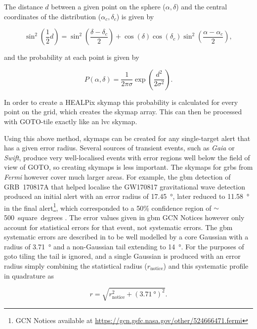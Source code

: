 \begin{colsection}
\begin{colsection}
The distance $d$ between a given point on the sphere ($\alpha, \delta$) and the central coordinates of the distribution ($\alpha_c, \delta_c$) is given by

\begin{equation}
    \sin^2 \left ( \frac{1}{2} d \right )
    = \sin^2 \left ( \frac{\delta-\delta_c}{2} \right)
      + \cos (\delta) \cos (\delta_c) \sin^2 \left ( \frac{\alpha-\alpha_c}{2} \right),
    \label{eq:gaussian_distance}
\end{equation}

and the probability at each point is given by

\begin{equation}
    P(\alpha, \delta) = \frac{1}{2\pi\sigma} \exp \left ( \frac{d^2}{2\sigma^2} \right ).
    \label{eq:gaussian_prob}
\end{equation}

In order to create a HEALPix skymap this probability is calculated for every point on the grid, which creates the skymap array. This can then be processed with GOTO-tile exactly like an \gls{lvc} skymap.

Using this above method, skymaps can be created for any single-target alert that has a given error radius. Several sources of transient events, such as \textit{Gaia} or \textit{Swift}, produce very well-localised events with error regions well below the field of view of GOTO, so creating skymaps is less important. The skymaps for \glspl{grb} from \textit{Fermi} however cover much larger areas. For example, the \gls{gbm} detection of GRB~170817A that helped localise the GW170817 gravitational wave detection produced an initial alert with an error radius of \SI{17.45}{\degree}, later reduced to \SI{11.58}{\degree} in the final alert\footnote{GCN Notices available at \url{https://gcn.gsfc.nasa.gov/other/524666471.fermi}}, which corresponded to a 50\% confidence region of $\sim$500~square~degrees \citep{GW170817_Fermi}. The error values given in \gls{gbm} GCN Notices however only account for statistical errors for that event, not systematic errors. The \gls{gbm} systematic errors are described in \citet{Fermi_localisation} to be well modelled by a core Gaussian with a radius of \SI{3.71}{\degree} and a non-Gaussian tail extending to \SI{14}{\degree}. For the purposes of \gls{goto} tiling the tail is ignored, and a single Gaussian is produced with an error radius simply combining the statistical radius ($r_\text{notice}$) and this  systematic profile in quadrature as

\begin{equation}
    r = \sqrt{r_\text{notice}^2 + {(\SI{3.71}{\degree})}^2}.
    \label{eq:fermi_radius}
\end{equation}


\end{colsection}
\end{colsection}
